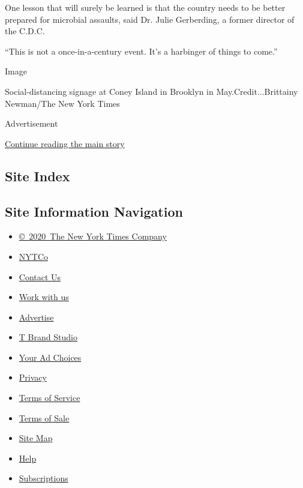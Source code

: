One lesson that will surely be learned is that the country needs to be
better prepared for microbial assaults, said Dr. Julie Gerberding, a
former director of the C.D.C.

``This is not a once-in-a-century event. It's a harbinger of things to
come.''

Image

Social-distancing signage at Coney Island in Brooklyn in
May.Credit...Brittainy Newman/The New York Times

Advertisement

\protect\hyperlink{after-bottom}{Continue reading the main story}

\hypertarget{site-index}{%
\subsection{Site Index}\label{site-index}}

\hypertarget{site-information-navigation}{%
\subsection{Site Information
Navigation}\label{site-information-navigation}}

\begin{itemize}
\tightlist
\item
  \href{https://help.nytimes.com/hc/en-us/articles/115014792127-Copyright-notice}{©~2020~The
  New York Times Company}
\end{itemize}

\begin{itemize}
\tightlist
\item
  \href{https://www.nytco.com/}{NYTCo}
\item
  \href{https://help.nytimes.com/hc/en-us/articles/115015385887-Contact-Us}{Contact
  Us}
\item
  \href{https://www.nytco.com/careers/}{Work with us}
\item
  \href{https://nytmediakit.com/}{Advertise}
\item
  \href{http://www.tbrandstudio.com/}{T Brand Studio}
\item
  \href{https://www.nytimes.com/privacy/cookie-policy\#how-do-i-manage-trackers}{Your
  Ad Choices}
\item
  \href{https://www.nytimes.com/privacy}{Privacy}
\item
  \href{https://help.nytimes.com/hc/en-us/articles/115014893428-Terms-of-service}{Terms
  of Service}
\item
  \href{https://help.nytimes.com/hc/en-us/articles/115014893968-Terms-of-sale}{Terms
  of Sale}
\item
  \href{https://spiderbites.nytimes.com}{Site Map}
\item
  \href{https://help.nytimes.com/hc/en-us}{Help}
\item
  \href{https://www.nytimes.com/subscription?campaignId=37WXW}{Subscriptions}
\end{itemize}
